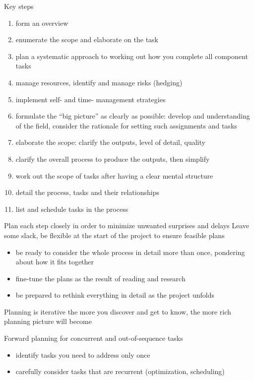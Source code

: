 \documentclass[10pt,a4paper,twocolumn]{article}
\begin{document}
Key steps
\begin{enumerate}
  \item form an overview
  \item enumerate the scope and elaborate on the task
  \item plan a systematic approach to working out how you complete all component tasks
  \item manage resources, identify and manage risks (hedging)
  \item implement self- and time- management strategies
  \item formulate the ``big picture'' as clearly as possible: develop and understanding
  of the field, consider the rationale for setting such assignments and tasks
  \item elaborate the scope: clarify the outputs, level of detail, quality
  \item clarify the overall process to produce the outputs, then simplify
  \item work out the scope of tasks after having a clear mental structure
  \item detail the process, tasks and their relationships
  \item list and schedule tasks in the process
\end{enumerate}

Plan each step closely in order to minimize unwanted surprises and delays Leave some
slack, be flexible at the start of the project to ensure feasible plans
\begin{itemize}
  \item be ready to consider the whole process in detail more than once, pondering about
  how it fits together
  \item fine-tune the plans as the result of reading and research
  \item be prepared to rethink everything in detail as the project unfolds
\end{itemize}

Planning is iterative the more you discover and get to know, the more rich planning picture will become

Forward planning for concurrent and out-of-sequence tasks
\begin{itemize}
  \item identify tasks you need to address only once
  \item carefully consider tasks that are recurrent (optimization, scheduling)
\end{itemize}
\end{document}
